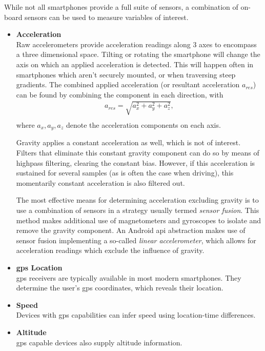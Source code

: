 While not all smartphones provide a full suite of sensors, a combination of on-board sensors can be used to measure variables of interest.
\begin{itemize}
\item \textbf{Acceleration}\\
Raw accelerometers provide acceleration readings along 3 axes to encompass a three dimensional space.
Tilting or rotating the smartphone will change the axis on which an applied acceleration is detected.
This will happen often in smartphones which aren't securely mounted, or when traversing steep gradients.
The combined applied acceleration (or resultant acceleration $a_{res}$) can be found by combining the component in each direction, with
\begin{equation}\label{eq:acc}
\begin{split}
a_{res} = \sqrt{a_{x}^2 + a_{y}^2 + a_{z}^2},\\
\end{split}
\end{equation}
where $a_{x}, a_{y}, a_{z}$ denote the acceleration components on each axis.\cite{david2020halliday}

Gravity applies a constant acceleration as well, which is not of interest.
Filters that eliminate this constant gravity component can do so by means of highpass filtering, clearing the constant bias.
However, if this acceleration is sustained for several samples (as is often the case when driving), this momentarily constant acceleration is also filtered out.

The most effective means for determining acceleration excluding gravity is to use a combination of sensors in a strategy usually termed \textit{sensor fusion}.\cite{sasiadek2002sensor}
This method makes additional use of magnetometers and gyroscopes to isolate and remove the gravity component.
An Android \ac{api} abstraction makes use of sensor fusion implementing a so-called \textit{linear accelerometer}, which allows for acceleration readings which exclude the influence of gravity.

\item \textbf{\Ac{gps} Location}\\
\Ac{gps} receivers are typically available in most modern smartphones.
They determine the user's \ac{gps} coordinates, which reveals their location.

\item \textbf{Speed}\\
Devices with \ac{gps} capabilities can infer speed using location-time differences.

\item \textbf{Altitude}\\
\Ac{gps} capable devices also supply altitude information.
\end{itemize}

